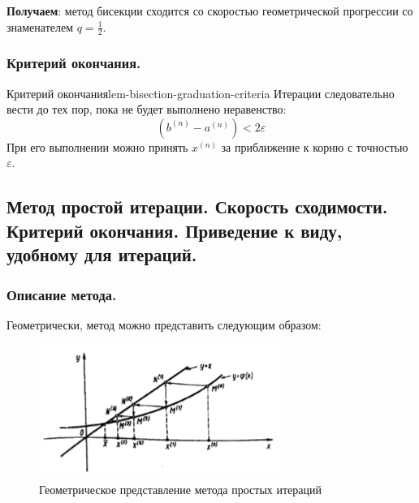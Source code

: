 \documentclass[14pt]{extarticle}
\begin{document}
        \textbf{Получаем}: метод бисекции сходится со скоростью геометрической прогрессии со знаменателем $q = \frac{1}{2}$.


    \subsubsection{Критерий окончания.}

        \begin{lemma}{Критерий окончания}{lem-bisection-graduation-criteria}
            Итерации следовательно вести до тех пор, пока не будет выполнено неравенство:
            $$(b^{(n)} - a^{(n)}) < 2\varepsilon$$
            При его выполнении можно принять $x^{(n)}$ за приближение к корню с точностью $\varepsilon$.
        \end{lemma}

\clearpage
\subsection{Метод простой итерации. Скорость сходимости. Критерий окончания. Приведение к виду, удобному для итераций.}

    \subsubsection{Описание метода.}

        Геометрически, метод можно представить следующим образом:

        \begin{figure}[H]
            \centering
            \includegraphics[width=0.7\textwidth]{images/simple-iterations-ex.png}
            \caption{Геометрическое представление метода простых итераций}
            \label{fig:simple-iterations-example}
        \end{figure}
\end{document}
